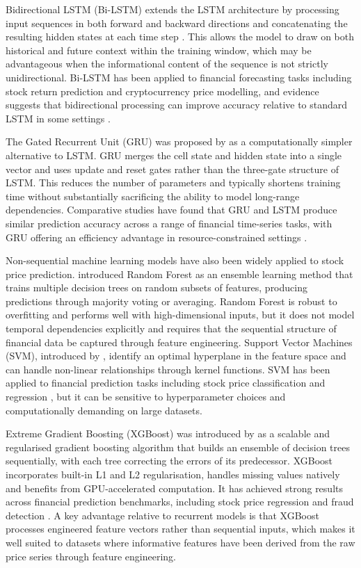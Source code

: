 Bidirectional LSTM (Bi-LSTM) extends the LSTM architecture by processing
input sequences in both forward and backward directions and concatenating the
resulting hidden states at each time step \citep{schuster1997bidirectional}.
This allows the model to draw on both historical and future context within
the training window, which may be advantageous when the informational
content of the sequence is not strictly unidirectional. Bi-LSTM has been applied
to financial forecasting tasks including stock return prediction and cryptocurrency
price modelling, and evidence suggests that bidirectional processing can improve
accuracy relative to standard LSTM in some settings
\citep{murugesan2022bilstm, hamayel2021bilstm}.

The Gated Recurrent Unit (GRU) was proposed by \citet{cho2014learning} as
a computationally simpler alternative to LSTM. GRU merges the cell state
and hidden state into a single vector and uses update and reset gates rather
than the three-gate structure of LSTM. This reduces the number of parameters
and typically shortens training time without substantially sacrificing the
ability to model long-range dependencies. Comparative studies have found
that GRU and LSTM produce similar prediction accuracy across a range of
financial time-series tasks, with GRU offering an efficiency advantage in
resource-constrained settings \citep{hamayel2021bilstm}.

Non-sequential machine learning models have also been widely applied to stock
price prediction. \citet{breiman2001random} introduced Random Forest as an
ensemble learning method that trains multiple decision trees on random subsets
of features, producing predictions through majority voting or averaging. Random
Forest is robust to overfitting and performs well with high-dimensional inputs,
but it does not model temporal dependencies explicitly and requires that the
sequential structure of financial data be captured through feature engineering.
Support Vector Machines (SVM), introduced by \citet{cortes1995support},
identify an optimal hyperplane in the feature space and can handle non-linear
relationships through kernel functions. SVM has been applied to financial
prediction tasks including stock price classification and regression
\citep{ji2022svm}, but it can be sensitive to hyperparameter choices and
computationally demanding on large datasets.

Extreme Gradient Boosting (XGBoost) was introduced by \citet{chen2016xgboost}
as a scalable and regularised gradient boosting algorithm that builds an ensemble
of decision trees sequentially, with each tree correcting the errors of its
predecessor. XGBoost incorporates built-in L1 and L2 regularisation, handles
missing values natively and benefits from GPU-accelerated computation. It has
achieved strong results across financial prediction benchmarks, including stock
price regression and fraud detection \citep{wu2023xgboost, zhu2023lstmxgboost}.
A key advantage relative to recurrent models is that XGBoost processes engineered
feature vectors rather than sequential inputs, which makes it well suited to
datasets where informative features have been derived from the raw price series
through feature engineering.

